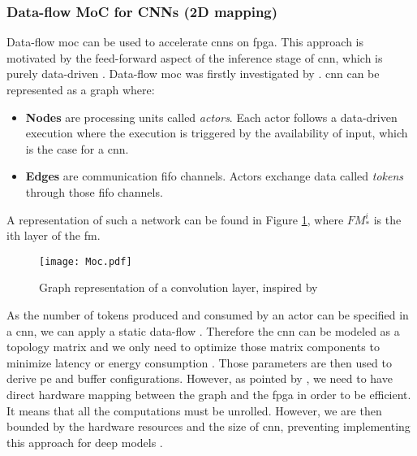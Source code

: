 \subsubsection{Data-flow MoC for CNNs (2D mapping)}
%
%
Data-flow \acrfull{moc} can be used to accelerate \acrshort{cnn}s on \acrshort{fpga}. This approach is motivated by the feed-forward aspect of the inference stage of \acrshort{cnn}, which is purely data-driven \cite{abdelouahab_accelerating_2018}. Data-flow \acrfull{moc} was firstly investigated by \textcite{lin_li_low_2016}. \acrshort{cnn} can be represented as a graph where:
\begin{itemize}
    \item \textbf{Nodes} are processing units called \textit{actors}. Each actor follows a data-driven execution where the execution is triggered by the availability of input, which is the case for a \acrshort{cnn}.
    \item \textbf{Edges} are communication \acrshort{fifo} channels. Actors exchange data called \textit{tokens} through those \acrshort{fifo} channels.
\end{itemize}
A representation of such a network can be found in Figure \ref{fig:moc}, where $FM_{*}^{i}$ is the ith layer of the \acrshort{fm}.
%
\begin{figure}[H]
    \centering
    \texttt{[image: Moc.pdf]}
    \caption{Graph representation of a convolution layer, inspired by \cite{abdelouahab_accelerating_2018}}
    \label{fig:moc}
\end{figure}

As the number of tokens produced and consumed by an actor can be specified in a \acrshort{cnn}, we can apply a static data-flow \cite{lee_static_1987}. Therefore the \acrshort{cnn} can be modeled as a topology matrix and we only need to optimize those matrix components to minimize latency or energy consumption \cite{venieris_latency-driven_2017}. Those parameters are then used to derive \acrshort{pe} and buffer configurations. However, as pointed by \textcite{abdelouahab_tactics_2017}, we need to have direct hardware mapping between the graph and the \acrshort{fpga} in order to be efficient. It means that all the computations must be unrolled. However, we are then bounded by the hardware resources and the size of \acrshort{cnn}, preventing implementing this approach for deep models \cite{abdelouahab_accelerating_2018}.
%
